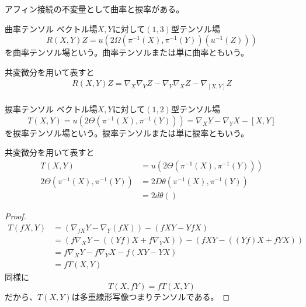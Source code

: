 アフィン接続の不変量として曲率と捩率がある。
\begin{dfn}{曲率テンソル}
	ベクトル場$X, Y$に対して$(1, 3)$型テンソル場
		\[R(X, Y)Z = u(2\Omega(\pi^{-1}(X), \pi^{-1}(Y))(u^{-1}(Z)))\]
	を曲率テンソル場という。曲率テンソルまたは単に曲率ともいう。
\end{dfn}
共変微分を用いて表すと
\begin{align*}
	R(X, Y)Z = \nabla_X\nabla_YZ - \nabla_Y\nabla_XZ - \nabla_[X, Y]Z\\
\end{align*}
\begin{dfn}{捩率テンソル}
	ベクトル場$X, Y$に対して$(1, 2)$型テンソル場
		\[T(X, Y) = u(2\Theta(\pi^{-1}(X), \pi^{-1}(Y))) = \nabla_XY - \nabla_YX - [X, Y]\]
	を捩率テンソル場という。捩率テンソルまたは単に捩率ともいう。
\end{dfn}

共変微分を用いて表すと
\begin{align*}
	T(X, Y) &= u(2\Theta(\pi^{-1}(X), \pi^{-1}(Y)))\\
	2\Theta(\pi^{-1}(X), \pi^{-1}(Y))
	&= 2D\theta(\pi^{-1}(X), \pi^{-1}(Y))\\
	&= 2d\theta()
\end{align*}
\begin{proof}
	\begin{align*}
		T(fX, Y) &= (\nabla_{fX}Y - \nabla_Y(fX)) - (fXY - YfX)\\
		&= (f\nabla_XY - ((Yf)X + f\nabla_YX)) - (fXY - ((Yf)X + fYX))\\
		&= f\nabla_XY - f\nabla_YX - f(XY - YX)\\
		&= fT(X, Y)
	\end{align*}
	同様に
		\[T(X, fY) = fT(X, Y)\]
	だから、$T(X, Y)$は多重線形写像つまりテンソルである。
\end{proof}


